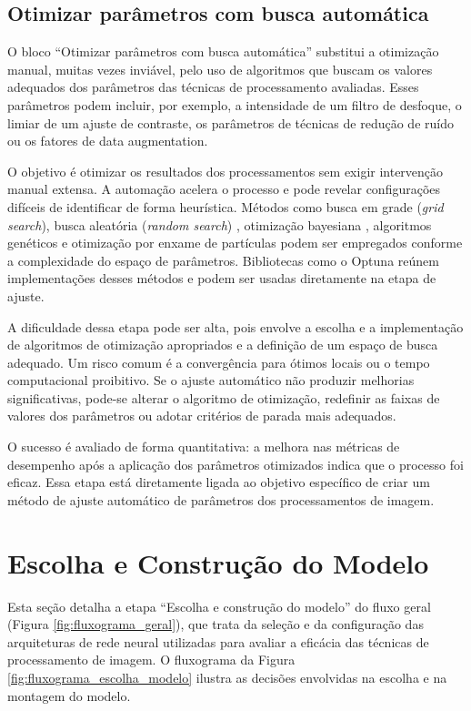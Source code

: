 \subsection{Otimizar parâmetros com busca automática}
O bloco ``Otimizar parâmetros com busca automática'' substitui a otimização manual, muitas vezes inviável, pelo uso de algoritmos que buscam os valores adequados dos parâmetros das técnicas de processamento avaliadas. Esses parâmetros podem incluir, por exemplo, a intensidade de um filtro de desfoque, o limiar de um ajuste de contraste, os parâmetros de técnicas de redução de ruído ou os fatores de data augmentation.

O objetivo é otimizar os resultados dos processamentos sem exigir intervenção manual extensa. A automação acelera o processo e pode revelar configurações difíceis de identificar de forma heurística. Métodos como busca em grade (\textit{grid search}), busca aleatória (\textit{random search}) \cite{bergstra2012random}, otimização bayesiana \cite{snoek2012practical}, algoritmos genéticos e otimização por enxame de partículas \cite{kennedy1995particle} podem ser empregados conforme a complexidade do espaço de parâmetros. Bibliotecas como o Optuna \cite{akiba2019optuna} reúnem implementações desses métodos e podem ser usadas diretamente na etapa de ajuste.

A dificuldade dessa etapa pode ser alta, pois envolve a escolha e a implementação de algoritmos de otimização apropriados e a definição de um espaço de busca adequado. Um risco comum é a convergência para ótimos locais ou o tempo computacional proibitivo. Se o ajuste automático não produzir melhorias significativas, pode-se alterar o algoritmo de otimização, redefinir as faixas de valores dos parâmetros ou adotar critérios de parada mais adequados.

O sucesso é avaliado de forma quantitativa: a melhora nas métricas de desempenho após a aplicação dos parâmetros otimizados indica que o processo foi eficaz. Essa etapa está diretamente ligada ao objetivo específico de criar um método de ajuste automático de parâmetros dos processamentos de imagem.

\section{Escolha e Construção do Modelo}

Esta seção detalha a etapa ``Escolha e construção do modelo'' do fluxo geral (Figura \ref{fig:fluxograma_geral}), que trata da seleção e da configuração das arquiteturas de rede neural utilizadas para avaliar a eficácia das técnicas de processamento de imagem. O fluxograma da Figura \ref{fig:fluxograma_escolha_modelo} ilustra as decisões envolvidas na escolha e na montagem do modelo.

